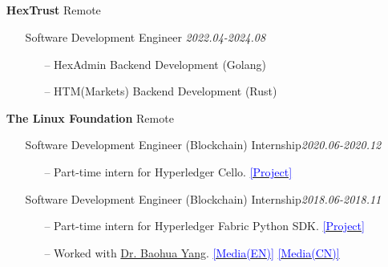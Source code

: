 \documentclass[11pt]{article}
\begin{document}
\subsection*{}
\begin{itemize}[leftmargin=0em, noitemsep, nolistsep]
    \setlength\itemsep{1em}
    \item[] \large\textbf{HexTrust} \hfill Remote
    \begin{itemize}[noitemsep, nolistsep, leftmargin=0em]
        \item[] {Software Development Engineer} \hfill \textit{2022.04-2024.08}
         \begin{itemize}
            \small
            \item[--] HexAdmin Backend Development (Golang)
            \item[--] HTM(Markets) Backend Development (Rust)
         \end{itemize}
    \end{itemize}
    \item[] \large\textbf{The Linux Foundation} \hfill Remote
        \begin{itemize}[noitemsep, nolistsep, leftmargin=0em]
            \item[] Software Development Engineer (Blockchain) Internship\hfill \textit{2020.06-2020.12}
            \begin{itemize}
                \small
                \item[--] Part-time intern for Hyperledger Cello. \href{https://github.com/hyperledger/cello}{\textcolor{blue}{[Project]}}
            \end{itemize}
            \item[] Software Development Engineer (Blockchain) Internship\hfill \textit{2018.06-2018.11}
             \begin{itemize}
                \small
                \item[--] Part-time intern for Hyperledger Fabric Python SDK. \href{https://github.com/hyperledger/fabric-sdk-py}{\textcolor{blue}{[Project]}}
                \item[--] Worked with \href{https://yeasy.github.io/}{Dr. Baohua Yang}. \href{https://www.hyperledger.org/blog/2018/06/13/meet-the-hyperledger-summer-2018-interns-part-2}{\textcolor{blue}{[Media(EN)]}} \href{https://archive.is/5nyBm}{\textcolor{blue}{[Media(CN)]}}
             \end{itemize}
        \end{itemize}


\end{itemize}
\end{document}
